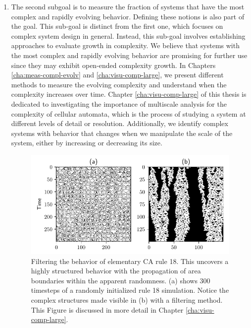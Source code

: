 \begin{enumerate}
  \item The second subgoal is to measure the fraction of systems that have the most complex and rapidly
        evolving behavior. Defining these notions is also part of the goal.
        This sub-goal is distinct from the first one, which focuses on complex system design in 
        general. Instead, this sub-goal involves establishing approaches to evaluate growth 
        in complexity.
        We believe that systems with the most complex and rapidly
        evolving behavior are promising for further use since
        they may exhibit open-ended complexity growth. In Chapters
        \ref{cha:meas-compl-evolv} and \ref{cha:visu-comp-large}, we present
        different methods to measure the evolving complexity and understand when the
        complexity increases over time. Chapter \ref{cha:visu-comp-large} of this thesis is dedicated to investigating the importance of multiscale analysis for the complexity of
        cellular automata, which is the process of studying a system at different levels of detail or resolution.   Additionally, we identify complex systems with behavior that
        changes when we manipulate the scale of the system, either by increasing or decreasing its size.
\begin{figure}[htbp]
  \centering
 \includegraphics[width=.9\linewidth]{figures/rule18_small}
 \caption{Filtering the behavior of elementary \acl{CA} rule 18. This
   uncovers a highly structured behavior with the propagation of area boundaries
   within the apparent randomness. (a) shows 300 timesteps
of a randomly initialized rule 18 simulation. Notice the complex structures made
visible in (b) with a filtering method. This Figure is discussed in more detail in Chapter \ref{cha:visu-comp-large}.}
  \label{fig:rule_18}
\end{figure}


\end{enumerate}
